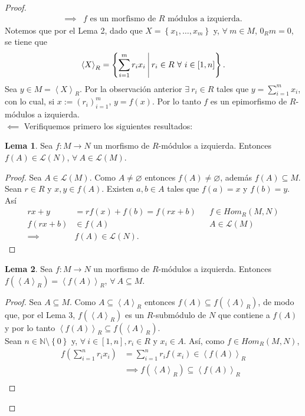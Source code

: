\documentclass{article}
\newcommand{\lrprth}[1]{
	\left(#1\right)
}
\newcommand{\lrbrack}[1]{
	\left\{#1\right\}
}
\newcommand{\fntuple}[3]{
	{\left({#1}_{#2}\right)}_{#2=1}^{#3}
}
\newcommand{\genmod}[2]{
	\left< #1\right>_{#2}
}
\newcommand{\genlin}[1]{
	\mathscr{L}\lrprth{#1}
}
\newcommand{\ringmodhom}[3]{
	Hom_{#1}\lrprth{#2,#3}
}
\theoremstyle{definition}
\theoremstyle{plain}
\theoremstyle{plain}
\theoremstyle{definition}
\theoremstyle{definition}
\theoremstyle{definition}
\theoremstyle{definition}
\theoremstyle{definition}
\newtheorem{lem}{Lema}
\theoremstyle{definition}
\begin{document}
\begin{enumerate}[label=\textbf{Ej \arabic*.}]
\begin{proof}
\begin{align*}
		\implies & f \text{ es un morfismo de $R$ módulos a izquierda.}
	\end{align*}
	Notemos que por el Lema 2, dado que $X=\lrbrack{x_1,\dotsc,x_m}$ y, $\forall\ m\in M$, $0_Rm=0$, se tiene que
	\begin{equation*}
		\genmod{X}{R}=\lrbrack{\sum_{i=1}^mr_ix_i\ \vline\ r_i\in R\ \forall\ i\in[1,n]}.
	\end{equation*}
	Sea $y\in M=\genmod{X}{R}$. Por la observación anterior $\exists\ r_i\in R$ tales que $y=\sum_{i=1}^{m}x_i$, con lo cual, si $x:=\fntuple{r}{i}{m}$, $y=f(x)$. Por lo tanto $f$ es un epimorfismo de $R$-módulos a izquierda.\\
	$\boxed{\impliedby}$ Verifiquemos primero los siguientes resultados:
	\begin{lem}
		Sea $f:M\rightarrow N$ un morfismo de $R$-módulos a izquierda. Entonces $f\lrprth{A}\in\genlin{N}$, $\forall\ A\in\genlin{M}$.
	\end{lem}
	\begin{proof}
		Sea $A\in \genlin{M}$. Como $A\neq\varnothing$ entonces $f\lrprth{A}\neq\varnothing$, además $f(A)\subseteq M$. Sean $r\in R$ y $x,y\in f(A)$. Existen $a,b\in A$ tales que $f(a)=x$ y $f(b)=y$. Así
		\begin{align*}
			rx+y&=rf(x)+f(b)=f(rx+b) && f\in\ringmodhom{R}{M}{N}\\
			f(rx+b)&\in f\lrprth{A} && A\in\genlin{M}\\
			\implies & f(A)\in\genlin{N}.
		\end{align*}
	\end{proof}
	\begin{lem}
	Sea $f:M\rightarrow N$ un morfismo de $R$-módulos a izquierda. Entonces $f\lrprth{\genmod{A}{R}}=\genmod{f\lrprth{A}}{R}$, $\forall\ A\subseteq M$.
	\end{lem}
	\begin{proof}
		Sea $A\subseteq M$. Como $A\subseteq\genmod{A}{R}$ entonces $f\lrprth{A}\subseteq f\lrprth{\genmod{A}{R}}$, de modo que, por el Lema 3, $f\lrprth{\genmod{A}{R}}$ es un $R$-submódulo de $N$ que contiene a $f(A)$ y por lo tanto $\genmod{f(A)}{R}\subseteq f\lrprth{\genmod{A}{R}}$.\\
		Sean $n\in\mathbb{N}\setminus\lrbrack{0}$ y, $\forall\ i\in[1,n], r_i\in R$ y $x_i\in A$. Así, como $f\in\ringmodhom{R}{M}{N}$,
		\begin{align*}
			f\lrprth{\sum_{i=1}^{n}r_ix_i}&=\sum_{i=1}^{n}r_i f(x_i)\in\genmod{f(A)}{R}\\
			 & \implies f\lrprth{\genmod{A}{R}} \subseteq \genmod{f(A)}{R}\\

\end{align*}
\end{proof}
\end{proof}
\end{enumerate}
\end{document}
